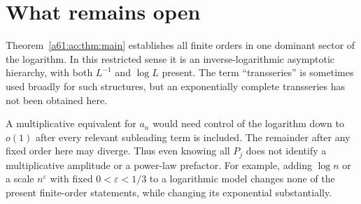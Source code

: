 \documentclass[11pt,letterpaper]{article}
\numberwithin{equation}{section}
\theoremstyle{remark}\newtheorem{remark}[theorem]{Remark}
\begin{document}
\section{What remains open}\label{a61:ao:sec:scope}
Theorem~\ref{a61:ao:thm:main} establishes all finite orders in one dominant
sector of the logarithm. In this restricted sense it is an
inverse-logarithmic asymptotic hierarchy, with both $L^{-1}$ and
$\log L$ present. The term ``transseries'' is sometimes used broadly
for such structures, but an exponentially complete transseries has
not been obtained here.

A multiplicative equivalent for $a_n$ would need control of the
logarithm down to $o(1)$ after every relevant subleading term is
included. The remainder after any fixed order here may diverge.
Thus even knowing all $P_j$ does not identify a multiplicative
amplitude or a power-law prefactor. For example, adding $\log n$
or a scale $n^\varepsilon$ with fixed $0<\varepsilon<1/3$ to a
logarithmic model changes none of the present finite-order
statements, while changing its exponential substantially.
\end{document}
